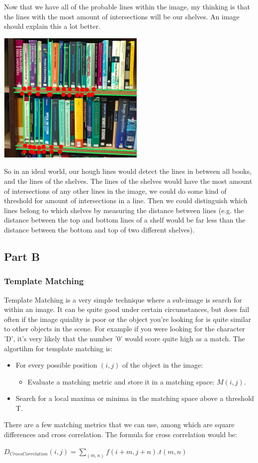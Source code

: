 \documentclass[12pt]{report}
\begin{document}
Now that we have all of the probable lines within the image, my thinking is that the lines with the most amount of intersections will be our shelves. An image should explain this a lot better.
\begin{center}
\includegraphics[scale=1]{Bookcases_found.jpg}
\end{center}
So in an ideal world, our hough lines would detect the lines in between all books, and the lines of the shelves. The lines of the shelves would have the most amount of intersections of any other lines in the image, we could do some kind of threshold for amount of intersections in a line. Then we could distinguish which lines belong to which shelves by measuring the distance between lines (e.g. the distance between the top and bottom lines of a shelf would be far less than the distance between the bottom and top of two different shelves).

\subsection{Part B}
\subsubsection{Template Matching}
Template Matching is a very simple technique where a sub-image is search for within an image. It can be quite good under certain circumstances, but does fail often if the image quiality is poor or the object you're looking for is quite similar to other objects in the scene. For example if you were looking for the character 'D', it's very likely that the number '0' would score quite high as a match. The algortihm for template matching is: 
\begin{itemize}
\item For every possible position $(i,j)$ of the object in the image:
\begin{itemize}
\item Evaluate a matching metric and store it in a matching space: $M(i,j)$.
\end{itemize}
\item Search for a local maxima or minima in the matching space above a threshold T.
\end{itemize}
There are a few matching metrics that we can use, among which are square differences and cross correlation. The formula for cross correlation would be:
\begin{center}
$D_{CrossCorrelation} (i,j) = \underset{(m,n)}{\sum} f(i+m, j+n) . t(m,n)$
\end{center}
\end{document}
